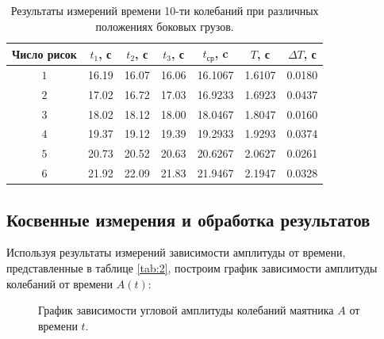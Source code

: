 \documentclass[12pt, a4paper]{article}
\begin{document}
\begin{table}[H]
\begin{center}
\begin{tabular}{|c|c|c|c|c|c|c|}
\hline 
Число рисок & $t_1$, с & $t_2$, с  & $t_3$, с & $t_{\text{ср}}$, c  & $T$, с  & $\Delta T$, с\\ 
\hline 
$1$ & 16.19 & 16.07 & 16.06 & 16.1067  & 1.6107  & 0.0180 \\ 
\hline 
$2$ & 17.02 & 16.72 & 17.03 & 16.9233  & 1.6923  & 0.0437 \\ 
\hline 
$3$ & 18.02 & 18.12 & 18.00 & 18.0467  & 1.8047  & 0.0160 \\ 
\hline 
$4$ & 19.37 & 19.12 & 19.39 & 19.2933  & 1.9293  & 0.0374 \\ 
\hline 
$5$ & 20.73 & 20.52 & 20.63 & 20.6267  & 2.0627  & 0.0261 \\ 
\hline 
$6$ & 21.92 & 22.09 & 21.83 & 21.9467  & 2.1947  & 0.0328 \\ 
\hline 

\end{tabular}
\caption{Результаты измерений времени 10-ти колебаний при различных положениях боковых грузов.}
\label{tab:3}
\end{center}
\end{table}

\newpage
\subsection{Косвенные измерения и обработка результатов}
Используя результаты измерений зависимости амплитуды от времени, представленные в таблице \ref{tab:2}, построим график зависимости амплитуды колебаний от времени $A(t)$:

\begin{figure}[H]
\centering
{}
\caption{График зависимости угловой амплитуды колебаний маятника $A$ от времени $t$.}
\label{gr:1}
\end{figure}
\end{document}
